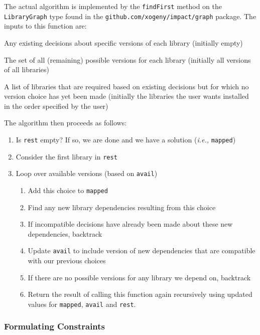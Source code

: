\documentclass[11pt,a4paper,twocolumn]{article}
\newcommand{\code}[1]{\texttt{#1}} %
\begin{document}
The actual algorithm is implemented by the \code{findFirst} method on
the \code{LibraryGraph} type found in the
\code{github.com/xogeny/impact/graph} package.  The inputs to this function are:

\begin{description}[noitemsep]
  \item[\code{mapped}] Any existing decisions about specific versions of each library
    (initially empty)
  \item[\code{avail}] The set of all (remaining) possible versions for each library
    (initially all versions of all libraries)
  \item[\code{rest}] A list of libraries that are required based on
    existing decisions but for which no version choice has yet been
    made (initially the libraries the user wants installed in the
    order specified by the user)
\end{description}

The algorithm then proceeds as follows:

\begin{enumerate}
  \item Is \code{rest} empty?  If so, we are done and we have a solution
    ({\it i.e.,} \code{mapped})
  \item Consider the first library in \code{rest}
  \item Loop over available versions (based on \code{avail})
    \begin{enumerate}
      \item Add this choice to \code{mapped}
      \item Find any new library dependencies resulting from this choice
      \item If incompatible decisions have already been made about
        these new dependencies, backtrack
      \item Update \code{avail} to include version of new dependencies
        that are compatible with our previous choices
      \item If there are no possible versions for any library we depend on, backtrack
      \item Return the result of calling this function again
        recursively using updated values for \code{mapped},
        \code{avail} and \code{rest}.
    \end{enumerate}
\end{enumerate}

\subsubsection{Formulating Constraints}
\end{document}
